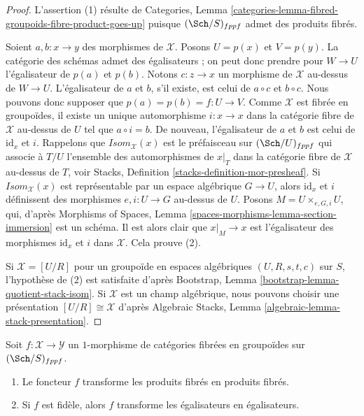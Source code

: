 \begin{proof}
L'assertion (1) résulte de
Categories, Lemma \ref{categories-lemma-fibred-groupoids-fibre-product-goes-up}
puisque $(\Sch/S)_{fppf}$ admet des produits fibrés.

\medskip\noindent
Soient $a, b : x \to y$ des morphismes de $\mathcal{X}$.
Posons $U = p(x)$ et $V = p(y)$. La catégorie des schémas admet des égalisateurs ;
on peut donc prendre pour $W \to U$ l'égalisateur de $p(a)$ et $p(b)$.
Notons $c : z \to x$ un morphisme de $\mathcal{X}$ au-dessus de $W \to U$.
L'égalisateur de $a$ et $b$, s'il existe, est celui de $a \circ c$
et $b \circ c$. Nous pouvons donc supposer que $p(a) = p(b) = f : U \to V$.
Comme $\mathcal{X}$ est fibrée en groupoïdes, il existe un unique automorphisme
$i : x \to x$ dans la catégorie fibre de $\mathcal{X}$ au-dessus de $U$ tel que
$a \circ i = b$. De nouveau, l'égalisateur de $a$ et $b$ est celui de
$\text{id}_x$ et $i$. Rappelons que $\mathit{Isom}_\mathcal{X}(x)$
est le préfaisceau sur $(\Sch/U)_{fppf}$ qui associe à
$T/U$ l'ensemble des automorphismes de $x|_T$ dans la catégorie fibre
de $\mathcal{X}$ au-dessus de $T$, voir
Stacks, Definition \ref{stacks-definition-mor-presheaf}.
Si $\mathit{Isom}_\mathcal{X}(x)$ est représentable par un espace algébrique
$G \to U$, alors $\text{id}_x$ et $i$ définissent des morphismes
$e, i : U \to G$ au-dessus de $U$. Posons $M = U \times_{e, G, i} U$, qui, d'après
Morphisms of Spaces, Lemma \ref{spaces-morphisms-lemma-section-immersion}
est un schéma. Il est alors clair que $x|_M \to x$ est l'égalisateur des
morphismes $\text{id}_x$ et $i$ dans $\mathcal{X}$.
Cela prouve (2).

\medskip\noindent
Si $\mathcal{X} = [U/R]$ pour un groupoïde en espaces algébriques
$(U, R, s, t, c)$ sur $S$, l'hypothèse de (2) est satisfaite d'après
Bootstrap, Lemma \ref{bootstrap-lemma-quotient-stack-isom}.
Si $\mathcal{X}$ est un champ algébrique, nous pouvons choisir une
présentation $[U/R] \cong \mathcal{X}$ d'après
Algebraic Stacks, Lemma \ref{algebraic-lemma-stack-presentation}.
\end{proof}

\begin{lemma}
\label{lemma-fibre-products-morphism}
Soit $f : \mathcal{X} \to \mathcal{Y}$ un $1$-morphisme de catégories
fibrées en groupoïdes sur $(\Sch/S)_{fppf}$.
\begin{enumerate}
\item Le foncteur $f$ transforme les produits fibrés en produits fibrés.
\item Si $f$ est fidèle, alors $f$ transforme les égalisateurs en égalisateurs.
\end{enumerate}
\end{lemma}

